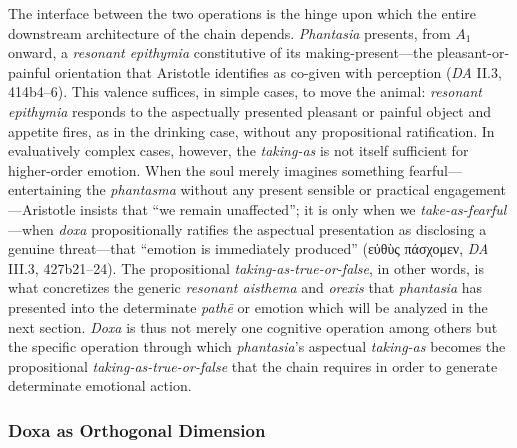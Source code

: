 \documentclass{article}
\newcommand{\gk}[1]{{\greekfont #1}}
\begin{document}
The interface between the two operations is the hinge upon which the entire downstream architecture of the chain depends. \textit{Phantasia} presents, from $A_1$ onward, a \textit{resonant epithymia} constitutive of its making-present---the pleasant-or-painful orientation that Aristotle identifies as co-given with perception (\textit{DA} II.3, 414b4--6). This valence suffices, in simple cases, to move the animal: \textit{resonant epithymia} responds to the aspectually presented pleasant or painful object and appetite fires, as in the drinking case, without any propositional ratification. In evaluatively complex cases, however, the \textit{taking-as} is not itself sufficient for higher-order emotion. When the soul merely imagines something fearful---entertaining the \textit{phantasma} without any present sensible or practical engagement---Aristotle insists that ``we remain unaffected''; it is only when we \textit{take-as-fearful}---when \textit{doxa} propositionally ratifies the aspectual presentation as disclosing a genuine threat---that ``emotion is immediately produced'' (\gk{εὐθὺς πάσχομεν}, \textit{DA} III.3, 427b21--24). The propositional \textit{taking-as-true-or-false}, in other words, is what concretizes the generic \textit{resonant aisthema} and \textit{orexis} that \textit{phantasia} has presented into the determinate \textit{pathē} or emotion which will be analyzed in the next section. \textit{Doxa} is thus not merely one cognitive operation among others but the specific operation through which \textit{phantasia}'s aspectual \textit{taking-as} becomes the propositional \textit{taking-as-true-or-false} that the chain requires in order to generate determinate emotional action.

\subsubsection*{Doxa as Orthogonal Dimension}
\end{document}
